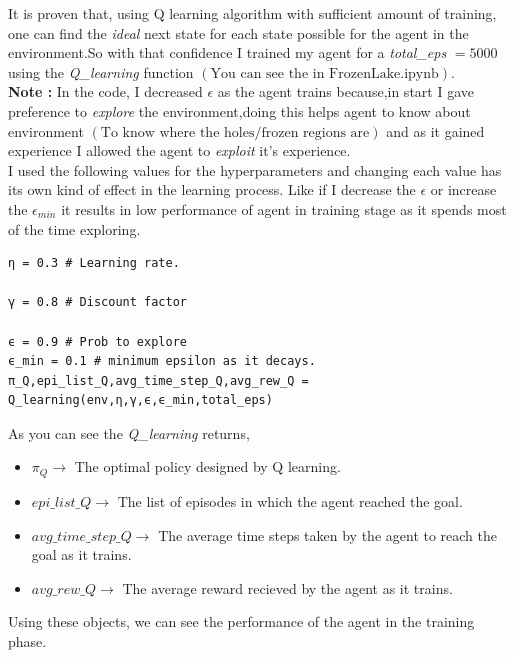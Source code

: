 \documentclass[journal,12pt,onecolumn]{IEEEtran}
\providecommand{\brak}[1]{\ensuremath{\left(#1\right)}}
\theoremstyle{remark}
\numberwithin{equation}{section}
\begin{document}
		It is proven that, using Q learning algorithm with sufficient amount of training, one can find the \textit{ideal} next state for each state possible for the agent in the environment.So with that confidence I trained my agent for a \textit{total\_eps} $= 5000$ using the \textit{Q\_learning} function $\brak{\text{You can see the in FrozenLake.ipynb}}$. \\
      \textbf{Note :} In the code, I decreased $\epsilon$ as the agent trains because,in start I gave preference to \emph{explore} the environment,doing this helps agent to know about environment $\brak{\text{To know where the holes/frozen regions are}}$ and as it gained experience I allowed the agent to \emph{exploit} it's experience.\\

I used the following values for the hyperparameters and changing each value has its own kind of effect in the learning process.	Like if I decrease the $\epsilon$ 
or increase the $\epsilon_{min}$ it results in low performance of agent in training stage as it spends most of the time exploring. 
 \begin{verbatim}
η = 0.3 # Learning rate.

γ = 0.8 # Discount factor

ϵ = 0.9 # Prob to explore
ϵ_min = 0.1 # minimum epsilon as it decays.
π_Q,epi_list_Q,avg_time_step_Q,avg_rew_Q = Q_learning(env,η,γ,ϵ,ϵ_min,total_eps)
 \end{verbatim}
 As you can see the \textit{Q\_learning} returns,
     \begin{itemize}
      \item $\pi_Q \rightarrow$ The optimal policy designed by Q learning.
      \item $ epi\_list\_Q \rightarrow$ The list of episodes in which the agent reached the goal.
      \item $ avg\_time\_step\_Q \rightarrow$ The average time steps taken by the agent to reach the goal as it trains.
      \item $ avg\_rew\_Q \rightarrow$ The average reward recieved by the agent as it trains.
     \end{itemize}
Using these objects, we can see the performance of the agent in the training phase.
\end{document}
